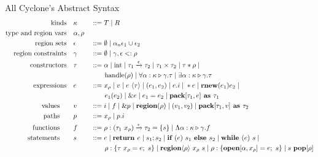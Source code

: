 \documentclass[aspectratio=169]{beamer}
\begin{document}
\begin{frame}{All Cyclone's Abstract Syntax}
\scriptsize{
\begin{alignat*}{2}
\text{kinds}\quad &\kappa &&::= T \altm R
\\
\text{type and region vars}\quad &\alpha,\rho &&
\\
\text{region sets}\quad &\epsilon &&::= \emptyset \altm \alpha_n \epsilon_1 \cup \epsilon_2
\\
\text{region constraints} \quad &\gamma &&::= \emptyset \altm \gamma, \epsilon <: \rho
\\
\text{constructors} \quad &\tau &&::= \alpha \altm \text{int} \altm \tau_1 \xrightarrow[]{\epsilon} \tau_2 \altm \tau_1 \times \tau_2 \altm \tau \ast \rho \altm
\\
~ & ~ && \qquad \text{handle}(\rho) \altm \forall\alpha:\kappa \triangleright \gamma.\tau \altm \exists \alpha:\kappa \triangleright \gamma.\tau
\\
\text{expressions} \quad &e &&::= x_\rho \altm v \altm e\ \langle\tau\rangle \altm (e_1,e_2) \altm e.i \altm \ast e \altm \textbf{rnew}(e_1)e_2 \altm
\\
~ & ~ && \qquad e_1(e_2) \altm \&e \altm e_1 = e_2 \altm \textbf{pack} [\tau_1, e]\textbf{ as } \tau_1
\\
\text{values} \qquad &v &&::= i \altm f \altm \&p \altm \textbf{region}(\rho) \altm (v_1, v_2) \altm \textbf{pack}[\tau_1,v]\textbf{ as } \tau_2
\\
\text{paths} \qquad &p &&::= x_\rho \altm p.i
\\
\text{functions} \qquad &f &&::= \rho:(\tau_1\ x_{\rho}) \xrightarrow[]{\epsilon} \tau_2 = \{s\} \altm \Lambda\alpha:\kappa \triangleright \gamma.f
\\
\text{statements} \qquad &s &&::= e \altm \textbf{return } e \altm s_1;s_2 \altm \textbf{if } (e)\ s_1 \textbf{ else } s_2 \altm \textbf{while } (e)\ s \altm
\\
~ & ~ && \qquad \rho:\{\tau\ x_\rho = e;\ s\} \altm \textbf{region}\langle\rho\rangle\ x_{\rho}\ s \altm \rho:\{\textbf{open}[\alpha,x_{\rho}] = e;\ s\} \altm s\ \textbf{pop}[\rho]
\end{alignat*}
    }
\end{frame}
\end{document}
